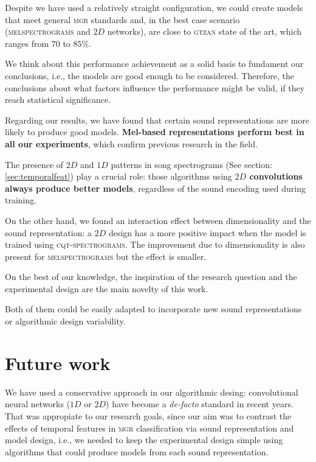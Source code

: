 Despite we have used a relatively straight configuration, we could create models that meet general \textsc{mgr} standards and, in the best case scenario (\textsc{melspectrograms} and $2D$ networks), are close to \textsc{gtzan} state of the art, which ranges from $70$ to $85\%$.

We think about this performance achievement as a solid basis to fundament our conclusions, i.e., the models are good enough to be considered. Therefore, the conclusions about what factors influence the performance might be valid, if they reach statistical significance.

Regarding our results, we have found that certain sound representations are more likely to produce good models. {\bf Mel-based representations perform best in all our experiments}, which confirm previous research in the field.

The presence of $2D$ and $1D$ patterns in song spectrograms (See section: \ref{sec:temporalfeat}) play a crucial role: those algorithms using {\bf $2D$ convolutions always produce better models}, regardless of the sound encoding used during training.

On the other hand, we found an interaction effect between dimensionality and the sound representation: a $2D$ design has a more positive impact when the model is trained using \textsc{cqt-spectrograms}. The improvement due to dimensionality is also present for \textsc{melspectrograms} but the effect is smaller.

On the best of our knowledge, the inspiration of the research question and the experimental design are the main novelty of this work.

Both of them could be easily adapted to incorporate new sound representations or algorithmic design variability.

\section{Future work}

We have used a conservative approach in our algorithmic desing: convolutional neural networks ($1D$ or $2D$) have become a {\it de-facto} standard in recent years. That was appropiate to our research goals, since our aim was to contrast the effects of temporal features in \textsc{\textsc{\textsc{mgr}}} classification via sound representation and model design, i.e., we needed to keep the experimental design simple using algorithms that could produce models from each sound representation.

